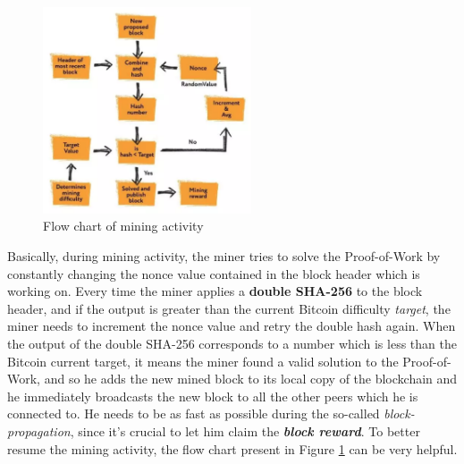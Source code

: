 \begin{figure}
\centering
\includegraphics[width=0.55\textwidth]{Figures/mining/mining-flow-chart.png}
\caption{Flow chart of mining activity}
\label{fig:mining-flow-chart}
\end{figure}
Basically, during mining activity, the miner tries to solve the Proof-of-Work by constantly changing the nonce value contained in the block header which is working on. Every time the miner applies a \textbf{double SHA-256} to the block header, and if the output is greater than the current Bitcoin difficulty \textit{target}, the miner needs to increment the nonce value and retry the double hash again.
When the output of the double SHA-256 corresponds to a number which is less than the Bitcoin current target, it means the miner found a valid solution to the Proof-of-Work, and so he adds the new mined block to its local copy of the blockchain and he immediately broadcasts the new block to all the other peers which he is connected to. He needs to be as fast as possible during the so-called \textit{block-propagation}, since it's crucial to let him claim the \textbf{\textit{block reward}}.
To better resume the mining activity, the flow chart present in Figure \ref{fig:mining-flow-chart} can be very helpful.\\

